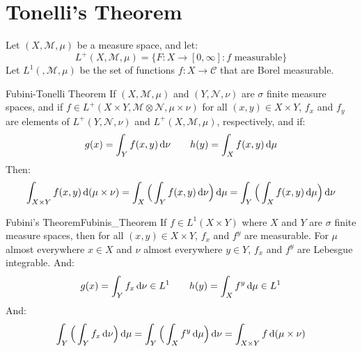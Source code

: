 \documentclass[crop=false,class=article]{standalone}                           %
\begin{document}
    \section{Tonelli's Theorem}
        Let $(X,\mathcal{M},\mu)$ be a measure space, and let:
        \begin{equation}
            L^{+}(X,\mathcal{M},\mu)=
            \{F:X\rightarrow[0,\infty]:f\textrm{ measurable}\}
        \end{equation}
        Let $L^{1}(,\mathcal{M},\mu)$ be the set of functions
        $f:X\rightarrow\mathcal{C}$ that are Borel measurable.
        \begin{ltheorem}{Fubini-Tonelli Theorem}{}
            If $(X,\mathcal{M},\mu)$ and $(Y,\mathcal{N},\nu)$ are $\sigma$
            finite measure spaces, and if
            $f\in{L}^{+}(X\times{Y},\mathcal{M}\otimes\mathcal{N},\mu\times\nu)$
            for all $(x,y)\in{X}\times{Y}$, $f_{x}$ and $f_{y}$ are elements of
            $L^{+}(Y,\mathcal{N},\nu)$ and $L^{+}(X,\mathcal{M},\mu)$,
            respectively, and if:
            \begin{equation}
                g(x)=\int_{Y}f(x,y)\mathop{}\!\mathrm{d}{\nu}
                \quad\quad
                h(y)=\int_{X}f(x,y)\mathop{}\!\mathrm{d}{\mu}
            \end{equation}
            Then:
            \begin{equation}
                \int_{X\times{Y}}f(x,y)\mathop{}\!\mathrm{d}(\mu\times\nu)
                =\int_{X}\Big(\int_{Y}f(x,y)\mathop{}\!\mathrm{d}\nu\Big)\mathop{}\!\mathrm{d}\mu
                =\int_{Y}\Big(\int_{X}f(x,y)\mathop{}\!\mathrm{d}\mu\Big)\mathop{}\!\mathrm{d}\nu
            \end{equation}
        \end{ltheorem}
        \begin{ltheorem}{Fubini's Theorem}{Fubinis_Theorem}
            If $f\in{L}^{1}(X\times{Y})$ where $X$ and $Y$ are $\sigma$ finite
            measure spaces, then for all $(x,y)\in{X}\times{Y}$,
            $f_{x}$ and $f^{y}$ are measurable. For $\mu$ almost everywhere
            $x\in{X}$ and $\nu$ almost everywhere $y\in{Y}$, $f_{x}$ and
            $f^{y}$ are Lebesgue integrable. And:
            \begin{equation}
                g(x)=\int_{Y}f_{x}\mathop{}\!\mathrm{d}{\nu}\in{L}^{1}
                \quad\quad
                h(y)=\int_{X}f^{y}\mathop{}\!\mathrm{d}{\mu}\in{L}^{1}
            \end{equation}
            And:
            \begin{equation}
                \int_{Y}\Big(\int_{Y}f_{x}\mathop{}\!\mathrm{d}\nu\Big)\mathop{}\!\mathrm{d}\mu
                =\int_{Y}\Big(\int_{X}f^{y}\mathop{}\!\mathrm{d}\mu\Big)\mathop{}\!\mathrm{d}\nu
                =\int_{X\times{Y}}f\mathop{}\!\mathrm{d}(\mu\times\nu)
            \end{equation}
        \end{ltheorem}
\end{document}
